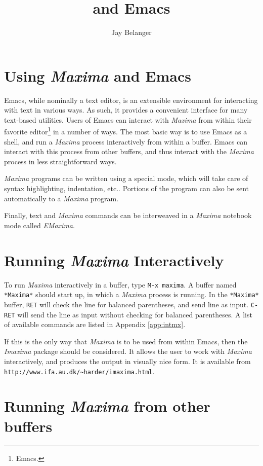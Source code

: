 \documentclass{article}
\title{\mx{} and Emacs}
\author{Jay Belanger}
\date{}
\newcommand{\emx}{\textsl{\sffamily EMaxima}}
\newcommand{\mx}{\textsl{\sffamily Maxima}}
\begin{document}
\maketitle

\section{Using \mx{} and Emacs}

Emacs, while nominally a text editor, is an extensible environment for
interacting with text in various ways.  As such, it provides a
convenient interface for many text-based utilities.  Users of Emacs
can interact with \mx{} from within their favorite
editor\footnote{Emacs.} in a number of ways.  The most basic way is to
use Emacs as a shell, and run a \mx{} process interactively from
within a buffer.  Emacs can interact with this process from other
buffers, and thus interact with the \mx{} process in less
straightforward ways.

\mx{} programs can be written using a special mode, which will take
care of syntax highlighting, indentation, etc..  Portions of the
program can also be sent automatically to a \mx{} program.

Finally, text and \mx{} commands can be interweaved in a \mx{}
notebook mode called \emx{}.

\section{Running \mx{} Interactively}

To run \mx{} interactively in a buffer, type \texttt{M-x maxima}.  A
buffer named \texttt{*Maxima*} should start up, in which a \mx{}
process is running.  In the \texttt{*Maxima*} buffer, \texttt{RET}
will check the line for balanced parentheses, and send line as input.
\texttt{C-RET} will send the line as input without checking for
balanced parentheses.  A list of available commands are listed in
Appendix \ref{app:intmx}.

If this is the only way that \mx{} is to be used from within Emacs,
then the \textsl{Imaxima} package should be considered.  It allows the
user to work with \mx{} interactively, and produces the output in
visually nice form.  It is available from
\verb+http://www.ifa.au.dk/~harder/imaxima.html+.

\section{Running \mx{} from other buffers}
\end{document}
